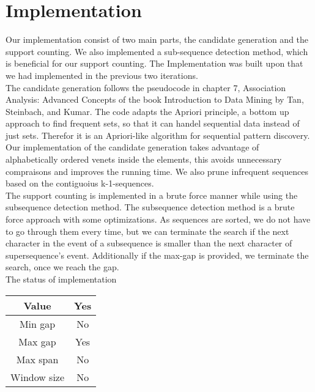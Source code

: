 \section{Implementation}
Our implementation consist of two main parts, the candidate generation and the support counting. We also implemented a sub-sequence detection method, which is beneficial for our support counting. The Implementation was built upon that we had implemented in the previous two iterations. \\

The candidate generation follows the pseudocode in chapter 7, Association Analysis: Advanced Concepts of the book Introduction to Data Mining by Tan, Steinbach, and Kumar. The code adapts the Apriori principle, a bottom up approach to find frequent sets, so that it  can handel sequential data instead of just sets. Therefor it is an Apriori-like algorithm for sequential pattern discovery.\\
Our implementation of the candidate generation takes advantage of alphabetically ordered venets inside the elements, this avoids unnecessary compraisons and  improves the running time. We also prune infrequent sequences based on the contiguoius {k-1}-sequences.\\

The support counting is implemented in a brute force manner while using the subsequence detection method. The subsequence detection method is a brute force approach with some optimizations. As sequences are sorted, we do not have to go through them every time, but we can terminate the search if the next character in the event of a subsequence is smaller than the next character of supersequence’s event. Additionally if the max-gap is provided, we terminate the search, once we reach the gap.\\

The status of implementation
\begin{tabular}{c|c}
\hline Value&Yes\\
\hline Min gap&No\\
\hline Max gap&Yes\\
\hline Max span&No\\
\hline Window size&No\\
\end{tabular}


